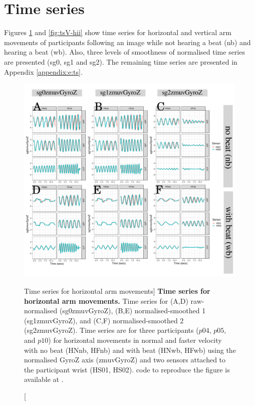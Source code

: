 \section{Time series}
Figures \ref{fig:tsH-hii} and \ref{fig:tsV-hii} show time series for 
horizontal and vertical arm movements of participants 
following an image while not hearing a beat (nb) and hearing a beat (wb).
Also, three levels of smoothness of normalised time series are presented
 (sg0, sg1 and sg2).
The remaining time series are presented in Appendix \ref{appendix:e:ts}.
\begin{figure}
\centering
\includegraphics[width=0.99\textwidth]{fig_5_01}
    	\caption
	[Time series for horizontal arm movements]{
	{\bf Time series for horizontal arm movements.}
		Time series for (A,D) raw-normalised (sg0zmuvGyroZ), 
		(B,E) normalised-smoothed 1 (sg1zmuvGyroZ), and
		(C,F) normalised-smoothed 2 (sg2zmuvGyroZ).
		Time series are for three participants 
		($p04$, $p05$, and $p10$) 
		for horizontal movements in normal and faster velocity with
		no beat	(HNnb, HFnb) and with beat (HNwb, HFwb) using 
		the normalised GyroZ axis (zmuvGyroZ) and 
		two sensors attached to the participant wrist (HS01, HS02).
	\R code to reproduce the figure is available at 
	.
        }
    \label{fig:tsH-hii}
\end{figure}
